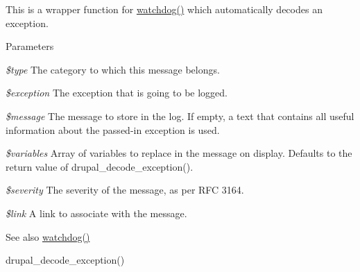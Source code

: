 This is a wrapper function for \hyperlink{bootstrap_8inc_acb7338e6740302727043d64e3ae1257b}{watchdog()} which automatically decodes an exception.


\begin{DoxyParams}{Parameters}
\item[{\em \$type}]The category to which this message belongs. \item[{\em \$exception}]The exception that is going to be logged. \item[{\em \$message}]The message to store in the log. If empty, a text that contains all useful information about the passed-\/in exception is used. \item[{\em \$variables}]Array of variables to replace in the message on display. Defaults to the return value of drupal\_\-decode\_\-exception(). \item[{\em \$severity}]The severity of the message, as per RFC 3164. \item[{\em \$link}]A link to associate with the message.\end{DoxyParams}
\begin{DoxySeeAlso}{See also}
\hyperlink{bootstrap_8inc_acb7338e6740302727043d64e3ae1257b}{watchdog()} 

drupal\_\-decode\_\-exception() 
\end{DoxySeeAlso}
